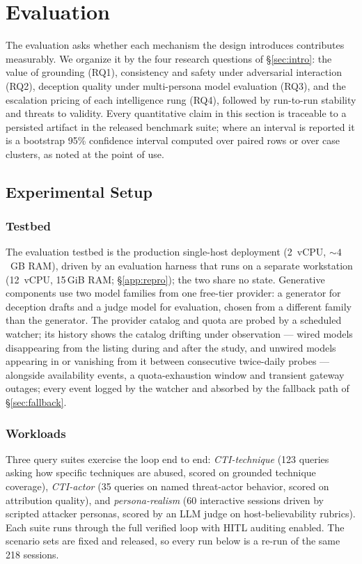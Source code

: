 \section{Evaluation}
\label{sec:evaluation}



The evaluation asks whether each mechanism the design introduces
contributes measurably. We organize it by the four research questions of
\S\ref{sec:intro}: the value of grounding (RQ1), consistency and safety
under adversarial interaction (RQ2), deception quality under
multi-persona model evaluation (RQ3), and the escalation pricing of each
intelligence rung
(RQ4), followed by run-to-run stability and threats to
validity. Every quantitative claim in this section is traceable to a
persisted artifact in the released benchmark suite; where an interval is
reported it is a bootstrap 95\% confidence interval computed over paired
rows or over case clusters, as noted at the point of use.

\subsection{Experimental Setup}
\label{sec:setup}

\subsubsection{Testbed}
The evaluation testbed is the production single-host deployment
(2~vCPU, ${\sim}4$~GB RAM), driven by an evaluation harness that runs on a
separate workstation (12~vCPU, 15\,GiB RAM; \S\ref{app:repro}); the two
share no state. Generative
components use two model families from one free-tier provider: a generator
for deception drafts and a judge model for evaluation, chosen from a
different family than the generator. The provider catalog and quota are
probed by a scheduled watcher; its history shows the catalog drifting
under observation --- wired models disappearing from the listing during
and after the study, and unwired models appearing in or vanishing from
it between consecutive twice-daily probes --- alongside availability
events, a quota-exhaustion window and transient gateway outages; every
event logged by the watcher and absorbed by the fallback path of
\S\ref{sec:fallback}.

\subsubsection{Workloads}
Three query suites exercise the loop end to end:
\emph{CTI-technique} (123 queries asking how specific \attck techniques
are abused, scored on grounded technique coverage),
\emph{CTI-actor} (35 queries on named threat-actor behavior, scored on
attribution quality), and \emph{persona-realism} (60 interactive sessions
driven by scripted attacker personas, scored by an LLM judge on
host-believability rubrics). Each suite runs through the full verified
loop with HITL auditing enabled. The scenario sets are fixed and released,
so every run below is a re-run of the same 218 sessions.


